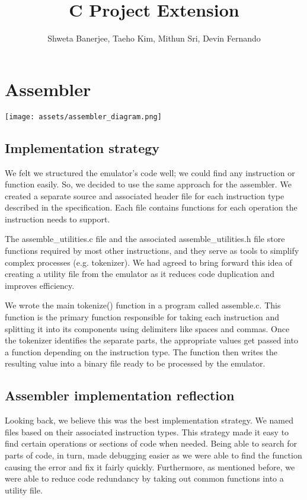 \documentclass[11pt]{article}
\begin{document}
\title{C Project Extension}
\author{Shweta Banerjee, Taeho Kim, Mithun Sri, Devin Fernando}

\maketitle

\section{Assembler}
\begin{center}
    \texttt{[image: assets/assembler\_diagram.png]}
\end{center}
\subsection{Implementation strategy}
\-\hspace{0.6cm}We felt we structured the emulator's code well; we could find any instruction or function easily. So, we decided to use the same approach for the assembler. We created a separate source and associated header file for each instruction type described in the specification. Each file contains functions for each operation the instruction needs to support. 

The assemble\_utilities.c file and the associated assemble\_utilities.h file store functions required by most other instructions, and they serve as tools to simplify complex processes (e.g. tokenizer). We had agreed to bring forward this idea of creating a utility file from the emulator as it reduces code duplication and improves efficiency. 

We wrote the main tokenize() function in a program called assemble.c. This function is the primary function responsible for taking each instruction and splitting it into its components using delimiters like spaces and commas. Once the tokenizer identifies the separate parts, the appropriate values get passed into a function depending on the instruction type. The function then writes the resulting value into a binary file ready to be processed by the emulator. 

\subsection{Assembler implementation reflection}
\-\hspace{0.6cm}Looking back, we believe this was the best implementation strategy. We named files based on their associated instruction types. This strategy made it easy to find certain operations or sections of code when needed. Being able to search for parts of code, in turn, made debugging easier as we were able to find the function causing the error and fix it fairly quickly. Furthermore, as mentioned before, we were able to reduce code redundancy by taking out common functions into a utility file.
\end{document}
